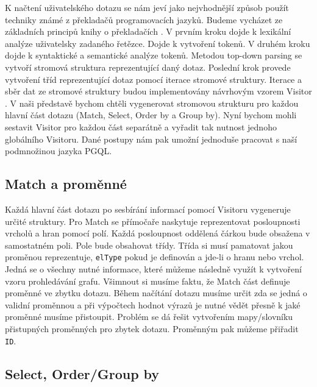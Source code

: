 K načtení uživatelského dotazu se nám jeví jako nejvhodnější způsob použít techniky známé z překladačů programovacích jazyků.
Budeme vycházet ze základních principů knihy o překladačích \citep{dragonBook}.
V prvním kroku dojde k lexikální analýze uživatelsky zadaného řetězce.
Dojde k vytvoření tokenů.
V druhém kroku dojde k syntaktické a semantické analýze tokenů.
Metodou top-down parsing \citep[str. 217]{dragonBook} se vytvoří stromová struktura reprezentující daný dotaz.
Poslední krok provede vytvoření tříd reprezentující dotaz pomocí iterace stromové struktury.
Iterace a sběr dat ze stromové struktury budou implementovány návrhovým vzorem Visitor \citep[str. 331]{patterns}.
V naši představě bychom chtěli vygenerovat stromovou strukturu pro každou hlavní část dotazu (Match, Select, Order by a Group by).
Nyní bychom mohli sestavit Visitor pro každou část separátně a vyřadit tak nutnost jednoho globálního Visitoru.
Dané postupy nám pak umožní jednoduše pracovat s naší podmnožinou jazyka PGQL.

\subsection{Match a proměnné} \label{anal.mathcandvar}

Každá hlavní část dotazu po sesbírání informací pomocí Visitoru vygeneruje určité struktury.
Pro Match se přímočaře naskytuje reprezentovat posloupnosti vrcholů a hran pomocí polí.
Každá posloupnost oddělená čárkou bude obsažena v samostatném poli.
Pole bude obsahovat třídy.
Třída si musí pamatovat jakou proměnou reprezentuje, \verb+elType+ pokud je definován a jde-li o hranu nebo vrchol.
Jedná se o všechny nutné informace, které můžeme následně využít k vytvoření vzoru prohledávání grafu.
Všimnout si musíme faktu, že Match část definuje proměnné ve zbytku dotazu.
Během načítání dotazu musíme určit zda se jedná o validní proměnnou a při výpočtech hodnot výrazů je nutné vědět přesně k jaké proměnné musíme přistoupit.
Problém se dá řešit vytvořením mapy/slovníku přistupných proměnných pro zbytek dotazu.
Proměnným pak můžeme přiřadit \verb+ID+.

\subsection{Select, Order/Group by}

